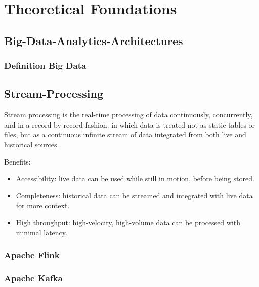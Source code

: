 \chapter{Theoretical Foundations}
\section{Big-Data-Analytics-Architectures}
\subsection{Definition Big Data}
\section{Stream-Processing}
Stream processing is the real-time processing of data continuously, concurrently, and in a record-by-record fashion.
in which data is treated not as static tables or files, but as a continuous infinite stream of data integrated from both live and
historical sources.

Benefits:
\begin{itemize}
	\item Accessibility: live data can be used while still in motion, before being stored.
	\item Completeness: historical data can be streamed and integrated with live data for more context.
	\item High throughput: high-velocity, high-volume data can be processed with minimal latency.
\end{itemize}
\subsection{Apache Flink}
\subsection{Apache Kafka}